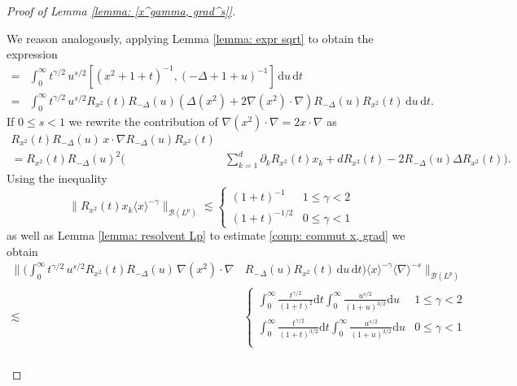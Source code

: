 \documentclass[10pt,a4paper]{amsart}
\begin{document}
\begin{proof}[Proof of Lemma \ref{lemma: [x^gamma, grad^s]}]
\begin{itemize}
    We reason analogously, applying Lemma \ref{lemma: expr sqrt} to obtain the expression
    \begin{align}
        [\langle x \rangle^\gamma , \langle \nabla \rangle^s] =& \int_0^\infty t^{\gamma/2}\,u^{s/2}[ (x^2 + 1+t)^{-1}, (-\Delta + 1 + u)^{-1}]\, \mathrm{d}u\, \mathrm{d}t \nonumber\\
         =& \int_0^\infty t^{\gamma/2}\,u^{s/2} R_{x^2}(t)R_{-\Delta} (u) (\Delta (x^2) + 2\nabla(x^2)\cdot \nabla)R_{-\Delta} (u)R_{x^2}(t)\, \mathrm{d}u\, \mathrm{d}t \label{comp: int commut}. 
    \end{align}
     If $0\leq s<1$ we rewrite the contribution of $\nabla(x^2)\cdot \nabla = 2x\cdot \nabla $ as 
     \begin{align}
        R_{x^2}(t)R_{-\Delta} (u) \, x\cdot \nabla R_{-\Delta} (u)R_{x^2}(t) & \nonumber\\
        =R_{x^2}(t)R_{-\Delta} (u)^2  \big(\,& \sum_{k=1}^d    \partial_k  R_{x^2}(t) x_k + dR_{x^2}(t)-2R_{-\Delta} (u) \Delta R_{x^2}(t) \big). \label{comp: commut x, grad}
    \end{align}
    Using the inequality
    \begin{equation*}
        \|R_{x^2}(t)x_k \langle x \rangle^{-\gamma}\|_{\mathcal{B}(L^p)} \lesssim \begin{cases}
            (1 + t)^{-1} & 1\leq \gamma <2\\
            (1 + t)^{-1/2} & 0 \leq \gamma <1
        \end{cases}
    \end{equation*}
as well as Lemma \ref{lemma: resolvent Lp} to estimate \eqref{comp: commut x, grad} we obtain
    \begin{align}
        \Big\| \Big (\int_0^\infty t^{\gamma/2}\,u^{s/2} R_{x^2}(t)R_{-\Delta} (u) \, \nabla(x^2)\cdot \nabla&\,R_{-\Delta} (u)R_{x^2} (t)\, \mathrm{d}u\, \mathrm{d}t\Big ) \langle x \rangle^{-\gamma} \langle \nabla \rangle^{-s}\Big\|_{\mathcal{B}(L^p)}\nonumber\\
        \lesssim  & \begin{cases}
            \int_0^\infty \frac{t^{\gamma/2}}{(1+t)^2} \mathrm{d}t  \int_0^\infty \frac{u^{s/2}}{(1+u)^{3/2}}  \mathrm{d}u & 1\leq \gamma <2\nonumber\\
            \int _0^\infty \frac{t^{\gamma/2}}{(1+t)^{3/2}} \mathrm{d}t  \int_0^\infty \frac{u^{s/2}}{(1+u)^{3/2}}  \mathrm{d}u & 0\leq \gamma <1\nonumber\\
        \end{cases}\nonumber\\

\end{align}
\end{itemize}
\end{proof}
\end{document}
